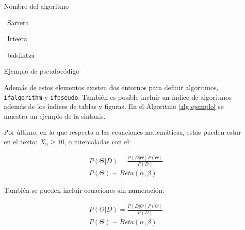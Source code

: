 \begin{ifalgorithm}[t]
	\begin{ifpseudo}{Nombre del algoritmo}
		\item	\In\ Sarrera
		\item	\Out\ Irteera
		\item	{}
		\item	{}
		\item	\EFor
		\item	\If\ baldintza \Then
		\item	{}
		\item	{}
		\item	\T{\Done}
		\item	\Else
		\item	\T{\Do}
		\item	{}
		\item	{}
		\item	\TT{\EFor}
		\item	{}
		\item	\EIf
		\item	{}
		\item	{}
		\item	\TT{\Return}
		\item	\T{\EIf}
	\end{ifpseudo}
	\caption{Ejemplo de pseudocódigo}\label{alg:ejemplo}
\end{ifalgorithm}

Además de estos elementos existen dos entornos para definir algoritmos, \texttt{ifalgorithm} y \texttt{ifpseudo}. También es posible incluir un índice de algoritmos además de los índices de tablas y figuras. En el Algoritmo \ref{alg:ejemplo} se muestra un ejemplo de la sintaxis.

Por último, en lo que respecta a las ecuaciones matemáticas, estas pueden estar en el texto: $X_n \geq 10$, o intercaladas con el:

\begin{eqnarray}
	P(\Theta|D) = \frac{P(D|\Theta)P(\Theta)}{P(D)}\\
	P(\Theta) \sim Beta(\alpha, \beta)
\end{eqnarray}

También se pueden incluir ecuaciones sin numeración:

\begin{eqnarray*}
	P(\Theta|D) = \frac{P(D|\Theta)P(\Theta)}{P(D)}\\
	P(\Theta) \sim Beta(\alpha, \beta)
\end{eqnarray*}



